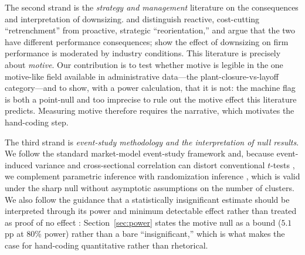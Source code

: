 \documentclass[12pt]{article}
\begin{document}
The second strand is the \emph{strategy and management} literature on the
consequences and interpretation of downsizing. \citet{cascio1993} and
\citet{love2005} distinguish reactive, cost-cutting ``retrenchment'' from proactive,
strategic ``reorientation,'' and argue that the two have different performance
consequences; \citet{guthrie2008} show the effect of downsizing on firm performance
is moderated by industry conditions. This literature is precisely about
\emph{motive}. Our contribution is to test whether motive is legible in the one
motive-like field available in administrative data---the plant-closure-vs-layoff
category---and to show, with a power calculation, that it is not: the machine flag
is both a point-null and too imprecise to rule out the motive effect this
literature predicts. Measuring motive therefore requires the narrative, which
motivates the hand-coding step.

The third strand is \emph{event-study methodology and the interpretation of null
results}. We follow the standard market-model event-study framework
\citep{mackinlay1997,brown1985} and, because event-induced variance and
cross-sectional correlation can distort conventional $t$-tests
\citep{boehmer1991,corrado1989,kolari2010}, we complement parametric inference with
randomization inference \citep{young2019}, which is valid under the sharp null
without asymptotic assumptions on the number of clusters. We also follow the
guidance that a statistically insignificant estimate should be interpreted through
its power and minimum detectable effect rather than treated as proof of no effect
\citep{abadie2020}: Section~\ref{sec:power} states the motive null as a bound
($5.1$pp at 80\% power) rather than a bare ``insignificant,'' which is what makes
the case for hand-coding quantitative rather than rhetorical.
\end{document}
